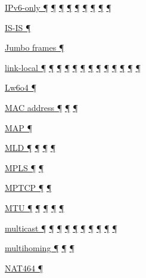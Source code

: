 \documentclass[
]{article}
\begin{document}
\hyperref[routing]{IPv6-only ¶}
\hyperref[source-and-destination-address-selection]{¶}
\hyperref[coexistence-with-legacy-ipv4]{¶}
\hyperref[dual-stack-scenarios]{¶}
\hyperref[translation-and-ipv4-as-a-service]{¶} \hyperref[tunnels]{¶}
\hyperref[security]{¶} \hyperref[deployment-by-carriers]{¶}
\hyperref[advanced-troubleshooting]{¶}

\hyperref[routing]{IS-IS ¶}

\hyperref[packet-size-and-jumbo-frames]{Jumbo frames ¶}

\hyperref[address-resolution]{link-local ¶} \hyperref[addresses]{¶}
\hyperref[auto-configuration]{¶} \hyperref[dns]{¶}
\hyperref[source-and-destination-address-selection]{¶}
\hyperref[filtering]{¶} \hyperref[network-design]{¶}
\hyperref[basic-windows-commands]{¶} \hyperref[energy-consumption]{¶}
\hyperref[multi-prefix-operation]{¶}
\hyperref[deployment-in-the-home]{¶} \hyperref[troubleshooting]{¶}
\hyperref[tools]{¶}

\hyperref[translation-and-ipv4-as-a-service]{Lw6o4 ¶}

\hyperref[address-resolution]{MAC address ¶} \hyperref[addresses]{¶}
\hyperref[address-and-prefix-management]{¶}

\hyperref[translation-and-ipv4-as-a-service]{MAP ¶}

\hyperref[address-resolution]{MLD ¶}
\hyperref[layer-2-considerations]{¶} \hyperref[troubleshooting]{¶}
\hyperref[advanced-troubleshooting]{¶}

\hyperref[layer-2-functions]{MPLS ¶} \hyperref[tunnels]{¶}

\hyperref[transport-protocols]{MPTCP ¶} \hyperref[multihoming]{¶}

\hyperref[extension-headers-and-options]{MTU ¶}
\hyperref[layer-2-functions]{¶} \hyperref[packet-format]{¶}
\hyperref[packet-size-and-jumbo-frames]{¶}
\hyperref[advanced-troubleshooting]{¶}

\hyperref[address-resolution]{multicast ¶} \hyperref[addresses]{¶}
\hyperref[auto-configuration]{¶} \hyperref[layer-2-functions]{¶}
\hyperref[ipv6-primary-differences-from-ipv4]{¶} \hyperref[filtering]{¶}
\hyperref[layer-2-considerations]{¶} \hyperref[energy-consumption]{¶}
\hyperref[troubleshooting]{¶} \hyperref[advanced-troubleshooting]{¶}

\hyperref[multi-prefix-operation]{multihoming ¶}
\hyperref[multihoming]{¶} \hyperref[deployment-in-the-enterprise]{¶}

\hyperref[translation-and-ipv4-as-a-service]{NAT464 ¶}
\end{document}
